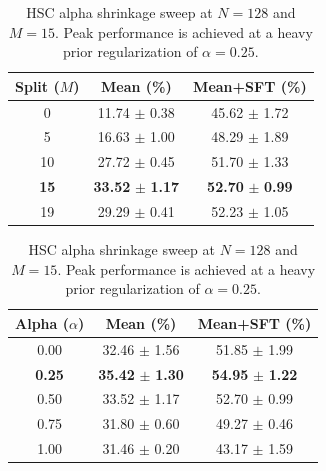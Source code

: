 \documentclass{article}
\begin{document}
\begin{table}[t]
\begin{minipage}{0.48\textwidth}
\centering
\caption{HSC split index sweep at $N=128$ and $\alpha=0.5$. Peak performance is achieved at $M=15$ (Layer 4 only calibrated channel-wise).}
\label{tab:split}
\vskip 0.15in
\begin{small}
\setlength{\tabcolsep}{4pt}
\begin{tabular}{ccc}
\toprule
Split ($M$) & Mean (\%) & Mean+SFT (\%) \\
\midrule
0 & 11.74 $\pm$ 0.38 & 45.62 $\pm$ 1.72 \\
5 & 16.63 $\pm$ 1.00 & 48.29 $\pm$ 1.89 \\
10 & 27.72 $\pm$ 0.45 & 51.70 $\pm$ 1.33 \\
\textbf{15} & \textbf{33.52} $\pm$ \textbf{1.17} & \textbf{52.70} $\pm$ \textbf{0.99} \\
19 & 29.29 $\pm$ 0.41 & 52.23 $\pm$ 1.05 \\
\bottomrule
\end{tabular}
\end{small}
\end{minipage}
\hfill
\begin{minipage}{0.48\textwidth}
\centering
\caption{HSC alpha shrinkage sweep at $N=128$ and $M=15$. Peak performance is achieved at a heavy prior regularization of $\alpha=0.25$.}
\label{tab:alpha}
\vskip 0.15in
\begin{small}
\setlength{\tabcolsep}{4pt}
\begin{tabular}{ccc}
\toprule
Alpha ($\alpha$) & Mean (\%) & Mean+SFT (\%) \\
\midrule
0.00 & 32.46 $\pm$ 1.56 & 51.85 $\pm$ 1.99 \\
\textbf{0.25} & \textbf{35.42} $\pm$ \textbf{1.30} & \textbf{54.95} $\pm$ \textbf{1.22} \\
0.50 & 33.52 $\pm$ 1.17 & 52.70 $\pm$ 0.99 \\
0.75 & 31.80 $\pm$ 0.60 & 49.27 $\pm$ 0.46 \\
1.00 & 31.46 $\pm$ 0.20 & 43.17 $\pm$ 1.59 \\
\bottomrule
\end{tabular}
\end{small}
\end{minipage}
\label{tab:ablations}
\vskip -0.1in
\vspace{-3mm}
\end{table}
\end{document}
